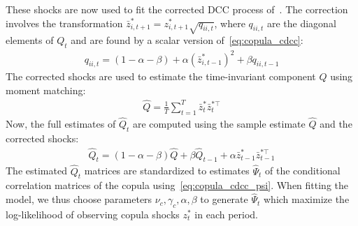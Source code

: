 These shocks are now used to fit the corrected DCC process of~\textcite{Aielli2013}. The correction involves the transformation $\bar{z}_{i,t+1}^* = z_{i,t+1}^* \sqrt{q_{ii,t}}$, where $q_{ii,t}$ are the diagonal elements of $Q_t$ and are found by a scalar version of~\autoref{eq:copula_cdcc}:
\begin{align}
  q_{ii,t} = (1 - \alpha - \beta)
    + \alpha (\bar{z}_{i,t-1}^*)^2
    + \beta q_{ii,t-1}
\end{align}
The corrected shocks are used to estimate the time-invariant component $Q$ using moment matching:
\begin{align}
  \hat{Q} = \frac{1}{T} \sum_{t=1}^T \bar{z}_{t}^* \bar{z}_t^{*\top}
\end{align}
Now, the full estimates of $\hat{Q}_t$ are computed using the sample estimate $\hat{Q}$ and the corrected shocks:
\begin{align}
  \hat{Q}_t = (1 - \alpha - \beta) \hat{Q}
    + \beta \hat{Q}_{t-1}
    + \alpha \bar{z}_{t-1}^* \bar{z}_{t-1}^{*\top}
\end{align}
The estimated $\hat{Q}_t$ matrices are standardized to estimates $\hat{\Psi}_t$ of the conditional correlation matrices of the copula using~\autoref{eq:copula_cdcc_psi}. When fitting the model, we thus choose parameters $\nu_c, \gamma_c, \alpha, \beta$ to generate $\hat{\Psi}_t$ which maximize the log-likelihood of observing copula shocks $z_t^*$ in each period.
